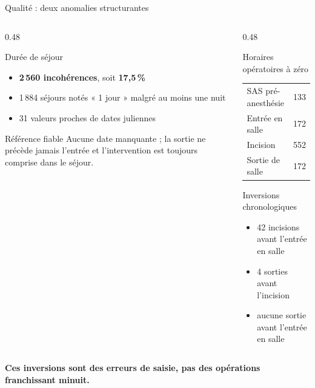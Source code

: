 \begin{frame}{Qualité : deux anomalies structurantes}
  \begin{columns}[T]
    \begin{column}{0.48\textwidth}
      \begin{alertblock}{Durée de séjour}
        \small
        \begin{itemize}\itemsep3pt
          \item \textbf{2\,560 incohérences}, soit \textbf{17,5\,\%}
          \item 1\,884 séjours notés « 1 jour » malgré au moins une nuit
          \item 31 valeurs proches de dates juliennes
        \end{itemize}
      \end{alertblock}

      \begin{block}{Référence fiable}
        \footnotesize Aucune date manquante ; la sortie ne précède jamais
        l'entrée et l'intervention est toujours comprise dans le séjour.
      \end{block}
    \end{column}

    \begin{column}{0.48\textwidth}
      \begin{exampleblock}{Horaires opératoires à zéro}
        \centering\scriptsize
        \begin{tabular}{@{}lr@{}}
          SAS pré-anesthésie & 133 \\
          Entrée en salle & 172 \\
          Incision & 552 \\
          Sortie de salle & 172 \\
        \end{tabular}
      \end{exampleblock}

      \begin{block}{Inversions chronologiques}
        \small
        \begin{itemize}\itemsep3pt
          \item 42 incisions avant l'entrée en salle
          \item 4 sorties avant l'incision
          \item aucune sortie avant l'entrée en salle
        \end{itemize}
      \end{block}
    \end{column}
  \end{columns}

  \begin{center}
    \small\textcolor{mcmPrimary}{\textbf{Ces inversions sont des erreurs de saisie,
    pas des opérations franchissant minuit.}}
  \end{center}
\end{frame}


